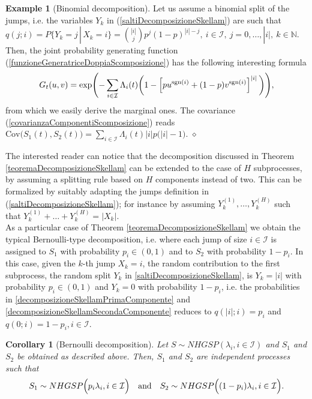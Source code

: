 \documentclass[12pt, twoside, english, headsepline]{article}
\newtheorem{corollary} {Corollary}[section] %
\theoremstyle{definition} %
\newtheorem{example}{Example}[section]
\numberwithin{equation}{section} %
\begin{document}
\begin{example}[Binomial decomposition]
	Let us assume a binomial split of the jumps, i.e. the variables $Y_k$ in (\ref{saltiDecomposizioneSkellam}) are such that $q(j;i) =  P\{Y_k = j \,|\,X_k = i\} = \binom{|i|}{j}p^j(1-p)^{|i|-j},\ i\in\mathcal{I}, \ j=0,\dots, |i|, \ k\in\mathbb{N}$. Then, the joint probability generating function (\ref{funzioneGeneratriceDoppiaScomposizione}) has the following interesting formula
	\begin{equation*}
		G_t(u,v) = \text{exp}\Biggl(- \sum_{i\in\mathcal{I}}\Lambda_i(t)\biggl(1- \Bigl[pu^{\text{sgn}(i)}+(1-p)v^{\text{sgn}(i)}\Bigr]^{|i|}\,\biggr)\Biggr),
	\end{equation*}
	from which we easily derive the marginal ones. The covariance (\ref{covarianzaComponentiScomposizione}) reads $ \text{Cov}\Big(S_1(t), S_2(t)\Big) = \sum_{i\in\mathcal{I}} \Lambda_i(t) |i|p\big(|i|-1\big) .$
	\hfill$\diamond$
\end{example}

The interested reader can notice that the decomposition discussed in Theorem \ref{teoremaDecomposizioneSkellam} can be extended to the case of $H$ subprocesses, by assuming a splitting rule based on $H$ components instead of two. This can be formalized by suitably adapting the jumps definition in (\ref{saltiDecomposizioneSkellam}); for instance by assuming $Y_k^{(1)},\dots,Y_k^{(H)}$ such that $Y_k^{(1)}+\dots+Y_k^{(H)} = |X_k|$.
\\

As a particular case of Theorem \ref{teoremaDecomposizioneSkellam} we obtain the typical Bernoulli-type decomposition, i.e. where each jump of size $i\in\mathcal{I}$ is assigned to $S_1$ with probability $p_i\in(0,1)$ and to $S_2$ with probability $1-p_i$. In this case, given the $k$-th jump $X_k=i$, the random contribution to the first subprocess, the random split $Y_k$ in \eqref{saltiDecomposizioneSkellam}, is $Y_k =|i|$ with probability $p_i\in (0,1)$ and $Y_k = 0$ with probability $1-p_i$, i.e. the probabilities in \eqref{decomposizioneSkellamPrimaComponente} and \eqref{decomposizioneSkellamSecondaComponente} reduces to $q(|i|;i) = p_i$ and $q(0;i) = 1-p_i, i\in\mathcal{I}$.

\begin{corollary}[Bernoulli decomposition]\label{proposizioneCoppiaSkellamScompostoBernoulli}
Let $S\sim NHGSP (\lambda_i, i\in \mathcal{I} )$ and $S_1$ and $S_2$ be obtained as described above. Then, $S_1$ and $S_2$ are independent processes such that
\begin{equation}\label{tesiCoppiaSkellamScompostoBernoulli}
S_1\sim NHGSP \Bigl(p_i\lambda_i, i\in \mathcal{I} \Bigr)\ \ \ \text{and}\ \ \ S_2\sim NHGSP\Bigl((1-p_i)\lambda_i, i\in \mathcal{I} \Bigr).
\end{equation}
\end{corollary}
\end{document}

